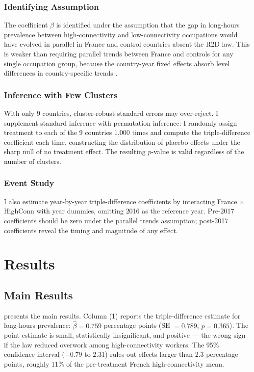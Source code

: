 \documentclass[12pt]{article}
\begin{document}
\subsubsection*{Identifying Assumption} The coefficient $\beta$ is identified under the assumption that the gap in long-hours prevalence between high-connectivity and low-connectivity occupations would have evolved in parallel in France and control countries absent the R2D law. This is weaker than requiring parallel trends between France and controls for any single occupation group, because the country-year fixed effects absorb level differences in country-specific trends \citep{olden2022triple}.

\subsubsection*{Inference with Few Clusters} With only 9 countries, cluster-robust standard errors may over-reject. I supplement standard inference with permutation inference: I randomly assign treatment to each of the 9 countries 1,000 times and compute the triple-difference coefficient each time, constructing the distribution of placebo effects under the sharp null of no treatment effect. The resulting $p$-value is valid regardless of the number of clusters.

\subsubsection*{Event Study} I also estimate year-by-year triple-difference coefficients by interacting France $\times$ HighConn with year dummies, omitting 2016 as the reference year. Pre-2017 coefficients should be zero under the parallel trends assumption; post-2017 coefficients reveal the timing and magnitude of any effect.


\section{Results}

\subsection{Main Results}



 presents the main results. Column (1) reports the triple-difference estimate for long-hours prevalence: $\hat{\beta} = 0.759$ percentage points (SE $= 0.789$, $p = 0.365$). The point estimate is small, statistically insignificant, and positive --- the wrong sign if the law reduced overwork among high-connectivity workers. The 95\% confidence interval ($-0.79$ to $2.31$) rules out effects larger than 2.3 percentage points, roughly 11\% of the pre-treatment French high-connectivity mean.
\end{document}
